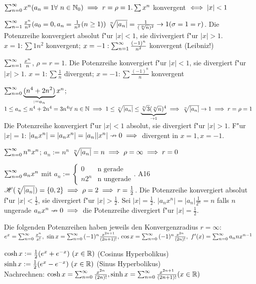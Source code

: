 \documentclass[a4paper,twoside,DIV15,BCOR12mm]{scrbook}
\begin{document}
\begin{beispiele}
\item $\reihenull{x^n} (a_n=1\forall\ n\in\MdN_0)\folgt r=\rho=1. \sum{x^n}$ konvergent $\iff |x|<1$
\item $\sum_{n=1}^{\infty}{\frac{x^n}{n^2}} (a_0=0, a_n=\frac{1}{n^2} (n\ge1))\ \sqrt[n]{|a_n|}=\frac{1}{(\sqrt[n]{n})^2} \to 1 (\sigma=1=r)$. Die Potenzreihe konvergiert absolut f"ur $|x|<1$, sie divivergiert f"ur $|x|>1$. $x=1: \sum{1}{n^2}$ konvergent; $x=-1: \sum_{n=1}^{\infty}{\frac{(-1)^n}{n^2}}$ konvergent (Leibniz!)
\item $\sum_{n=1}^{\infty}{\frac{x^n}{n}}$, $\rho=r=1$. Die Potenzreihe konvergiert f"ur $|x|<1$, sie divergiert f"ur $|x|>1$. $x=1: \sum{\frac{1}{n}}$ divergent; $x=-1: \sum{\frac{(-1)^n}{n}}$ konvergent
\item $\sum_{n=0}^{\infty}{\underbrace{(n^4+2n^2)}_{:=a_n}x^n}$; $1\le a_n \le n^4+2n^4=3n^4 \forall\ n\in\mathbb{N} \implies 1\le \sqrt[n]{|a_n|} \le \underbrace{\sqrt[n]{3}(\sqrt[n]{n})^4}_{\to 1}
\implies \sqrt[n]{[a_n]} \to 1 \implies r=\rho=1$ Die Potenzreihe konvergiert f"ur $|x|<1$ absolut, sie divergiert f"ur $|x|>1$. F"ur $|x|=1$: $|a_nx^n|=|a_nx^n|=|a_n||x^n| \nrightarrow 0 \implies $ divergent in $x=1, x=-1$.
\item $\sum_{n=0}^{\infty}{n^nx^n}$; $a_n:=n^n$ $\sqrt[n]{|a_n|}=n \implies \rho=\infty \implies r=0$
\item $\sum_{n=0}^{\infty}{a_nx^n}$ mit $a_n:=\begin{cases}
0&\text{n gerade}\\
n2^n&\text{n ungerade}\end{cases}$. A16 \folgt $\mathscr{H}(\sqrt[n]{|a_n|})=\{0, 2\}
\implies \rho=2 \implies r=\frac{1}{2}$. Die Potenzreihe konvergiert absolut f"ur $|x|<\frac{1}{2}$, sie divergiert f"ur $|x|>\frac{1}{2}$. Sei $|x|=\frac{1}{2}$. $|a_nx^n|=|a_n|\frac{1}{2^n}=n$ falls $n$ ungerade \folgt $a_nx^n \nrightarrow 0 \implies$ die Potenzreihe divergiert f"ur $|x|=\frac{1}{2}$.
\end{beispiele}
Die folgenden Potenzreihen haben jeweils den Konvergenzradius $r=\infty:$\\ $e^x=\reihenull{\frac{x^n}{x!},\ \sin x=\reihenull{(-1)^n\frac{x^{2n+1}}{(2n+1)!}}},\\ \cos x = \reihenull{(-1)^n\frac{x^{2n}}{(2n)!}},\ f'(x)=\reihenull{a_nnx^{n-1}}$

\begin{definition}
$\cosh x:=\frac{1}{2}(e^x+e^{-x})\ (x\in\MdR)$ (Cosinus Hyperbolikus)\\
$\sinh x:=\frac{1}{2}(e^x-e^{-x})\ (x\in\MdR)$ (Sinus Hyperbolikus)\\
Nachrechnen: $\cosh x=\sum_{n=0}^{\infty}{\frac{x^{2n}}{(2n)!}}, 
\sinh x=\sum_{n=0}^{\infty}{\frac{x^{2n+1}}{(2n+1)!}} (x\in\mathbb{R})$
\end{definition}
\end{document}
